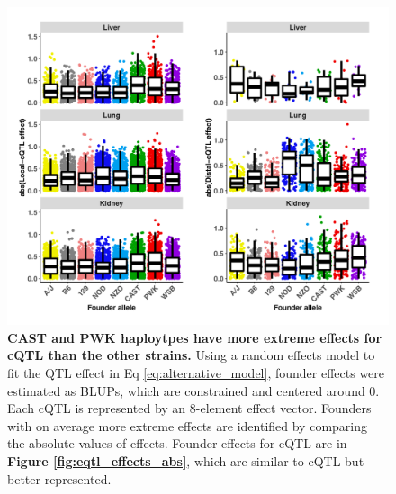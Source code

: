 \documentclass[9pt,twocolumn,twoside]{gsajnl}
\begin{document}
\begin{figure}[hp]
\renewcommand{\familydefault}{\sfdefault}\normalfont
\centering
\includegraphics[width=\textwidth, trim={0in 0in 0in 0in}, clip]{figs/all_cqtl_effects_abs.pdf}
\caption{\textbf{CAST and PWK haploytpes have more extreme effects for cQTL than the other strains.} Using a random effects model to fit the QTL effect in Eq \ref{eq:alternative_model}, founder effects were estimated as BLUPs, which are constrained and centered around 0. Each cQTL is represented by an 8-element effect vector. Founders with on average more extreme effects are identified by comparing the absolute values of effects. Founder effects for eQTL are in \textbf{Figure \ref{fig:eqtl_effects_abs}}, which are similar to cQTL but better represented.
\label{fig:cqtl_effects_abs}}
\end{figure}
\end{document}
